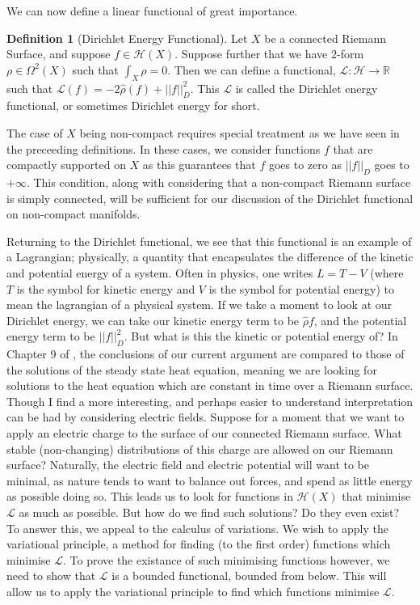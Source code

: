 \documentclass[a4paper,12pt]{report}
\theoremstyle{plain}
\theoremstyle{definition}
\newtheorem{defn}[thm]{Definition}
\begin{document}
We can now define a linear functional of great importance.

\begin{defn}[Dirichlet Energy Functional]
  Let $X$ be a connected Riemann Surface, and suppose $f \in \mathcal{H}(X)$. Suppose further that we have $2$-form $\rho \in \Omega^2 (X)$ such that $\int_X \rho = 0$. Then we can define a functional, $\mathcal{L}: 
  \mathcal{H} \rightarrow \mathbb{R}$ such that $\mathcal{L}(f) = -2\hat{\rho}(f)+||f||^2_D$. This $\mathcal{L}$ is called the Dirichlet energy functional, or sometimes Dirichlet energy for short.
\end{defn}

The case of $X$ being non-compact requires special treatment as we have seen in the preceeding definitions. In these cases, we consider functions $f$ that are compactly supported on $X$ as this guarantees that $f$ goes to zero as $||f||_D$ goes to $+\infty$. This condition, along with considering that a non-compact Riemann surface is simply connected, will be sufficient for our discussion of the Dirichlet functional on non-compact manifolds.

Returning to the Dirichlet functional, we see that this functional is an example of a Lagrangian; physically, a quantity that encapsulates the difference of the kinetic and potential energy of a system. Often in physics, one writes $L=T-V$ (where $T$ is the symbol for kinetic energy and $V$ is the symbol for potential energy) to mean the lagrangian of a physical system. If we take a moment to look at our Dirichlet energy, we can take our kinetic energy term to be $\hat{\rho}f$, and the potential energy term to be $||f||^2_D$. But what is this the kinetic or potential energy of? In Chapter 9 of \cite{donaldson}, the conclusions of our current argument are compared to those of the solutions of the steady state heat equation, meaning we are looking for solutions to the heat equation which are constant in time over a Riemann surface. Though I find a more interesting, and perhaps easier to understand interpretation can be had by considering electric fields. Suppose for a moment that we want to apply an electric charge to the surface of our connected Riemann surface. What stable (non-changing) distributions of this charge are allowed on our Riemann surface? Naturally, the electric field and electric potential will want to be minimal, as nature tends to want to balance out forces, and spend as little energy as possible doing so. This leads us to look for functions in $\mathcal{H}(X)$ that minimise $\mathcal{L}$ as much as possible. But how do we find such solutions? Do they even exist? To answer this, we appeal to the calculus of variations. We wish to apply the variational principle, a method for finding (to the first order) functions which minimise $\mathcal{L}$. To prove the existance of such minimising functions however, we need to show that $\mathcal{L}$ is a bounded functional, bounded from below. This will allow us to apply the variational principle to find which functions minimise $\mathcal{L}$.
\end{document}
